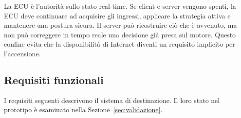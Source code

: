 \documentclass{article}
\begin{document}
La ECU è l'autorità sullo stato real-time. Se client e server vengono spenti,
la ECU deve continuare ad acquisire gli ingressi, applicare la strategia attiva
e mantenere una postura sicura. Il server può ricostruire ciò che è avvenuto,
ma non può correggere in tempo reale una decisione già presa sul motore. Questo
confine evita che la disponibilità di Internet diventi un requisito implicito
per l'accensione.

\subsection{Requisiti funzionali}

I requisiti seguenti descrivono il sistema di destinazione. Il loro stato nel
prototipo è esaminato nella Sezione~\ref{sec:validazione}.
\end{document}
